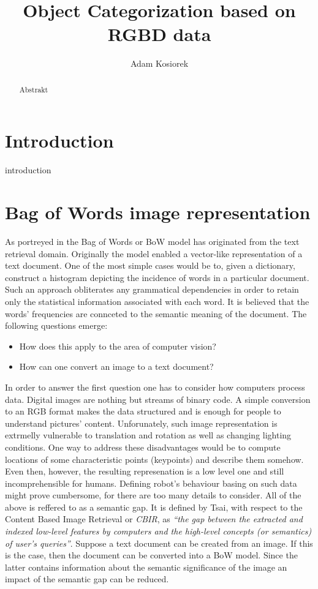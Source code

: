 \documentclass[a4paper,12pt]{article}
\title{Object Categorization based on RGBD data}
\author{Adam Kosiorek}
\begin{document}
\maketitle

\begin{abstract}

Abstrakt

\end{abstract}

%

\section{Introduction}

introduction

\section{Bag of Words image representation}

  As portreyed in \cite{tsai2012bag} the Bag of Words or BoW model has originated from the text retrieval domain. Originally the model enabled a vector-like representation of a text document. One of the most simple cases would be to, given a dictionary, construct a histogram depicting the incidence of words in a particular document. Such an approach obliterates any grammatical dependencies in order to retain only the statistical information associated with each word. It is believed that the words' frequencies are connceted to the semantic meaning of the document. The following questions emerge: 
  
  \begin{itemize}
    \item How does this apply to the area of computer vision?
    \item How can one convert an image to a text document? 
  \end{itemize}
  
  In order to answer the first question one has to consider how computers process data. Digital images are nothing but streams of binary code. A simple conversion to an RGB format makes the data structured and is enough for people to understand pictures' content. Unforunately, such image representation is extrmelly vulnerable to translation and rotation as well as changing lighting conditions. One way to address these disadvantages would be to compute locations of some characteristic points (keypoints) and describe them somehow. Even then, however, the resulting represenation is a low level one and still incomprehensible for humans. Defining robot's behaviour basing on such data might prove cumbersome, for there are too many details to consider. All of the above is reffered to as a semantic gap. It is defined by Tsai, with respect to the Content Based Image Retrieval or \textit{CBIR}, as \emph{``the gap between the extracted and indexed low-level features by computers and the high-level concepts (or semantics) of user’s queries''}. Suppose a text document can be created from an image. If this is the case, then the document can be converted into a BoW model. Since the latter contains information about the semantic significance of the image an impact of the semantic gap can be reduced.
  
\end{document}
